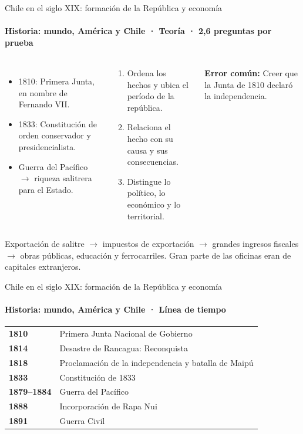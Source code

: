 \documentclass[aspectratio=169,11pt]{beamer}
\makeatletter
\newenvironment{lineatiempo}
  {\footnotesize\renewcommand{\arraystretch}{1.15}\begin{tabular}{@{}>{\leavevmode\bfseries\color{zinc700}}p{0.14\textwidth}p{0.74\textwidth}@{}}}
  {\end{tabular}}
\newlength{\ajustealto}
\newenvironment{ajustar}[1][0.74\textheight]
  {\setlength{\ajustealto}{#1}\begin{lrbox}{\ajustecaja}\begin{minipage}{\textwidth}}
  {\end{minipage}\end{lrbox}%
   \ifdim\dimexpr\ht\ajustecaja+\dp\ajustecaja\relax>\ajustealto
     \resizebox*{!}{\ajustealto}{\usebox{\ajustecaja}}\else\usebox{\ajustecaja}\fi}
\makeatother
\begin{document}
\begin{frame}{Chile en el siglo XIX: formación de la República y economía}
\label{tema-hi-chile-xix}
\framesubtitle{Historia: mundo, América y Chile · Teoría · 2,6 preguntas por prueba}
\begin{ajustar}
\begin{columns}[T,onlytextwidth]
\begin{itemize}\footnotesize
\item 1810: Primera Junta, en nombre de Fernando VII.
\item 1833: Constitución de orden conservador y presidencialista.
\item Guerra del Pacífico $\rightarrow$ riqueza salitrera para el Estado.
\end{itemize}
\begin{cajaregla}\scriptsize \begin{enumerate}\item Ordena los hechos y ubica el período de la república.\item Relaciona el hecho con su causa y sus consecuencias.\item Distingue lo político, lo económico y lo territorial.\end{enumerate}\end{cajaregla}
\begin{notagris}\scriptsize \textbf{Error común:} Creer que la Junta de 1810 declaró la independencia.\end{notagris}
\end{columns}
\begin{cajaclave}\footnotesize
Exportación de salitre $\rightarrow$ impuestos de exportación $\rightarrow$ grandes ingresos fiscales $\rightarrow$ obras públicas, educación y ferrocarriles. Gran parte de las oficinas eran de capitales extranjeros.
\end{cajaclave}
\end{ajustar}
\end{frame}

\begin{frame}{Chile en el siglo XIX: formación de la República y economía}
\framesubtitle{Historia: mundo, América y Chile · Línea de tiempo}
\begin{lineatiempo}
1810 & Primera Junta Nacional de Gobierno \\
1814 & Desastre de Rancagua: Reconquista \\
1818 & Proclamación de la independencia y batalla de Maipú \\
1833 & Constitución de 1833 \\
1879–1884 & Guerra del Pacífico \\
1888 & Incorporación de Rapa Nui \\
1891 & Guerra Civil \\
\end{lineatiempo}
\end{frame}
\end{document}
